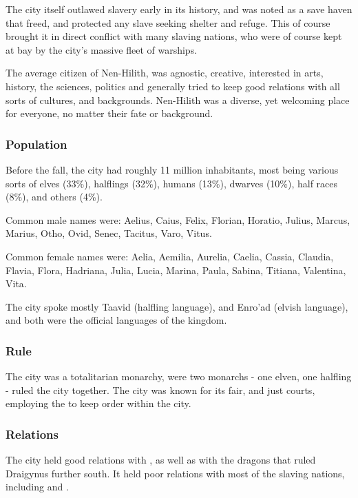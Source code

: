 The city itself outlawed slavery early in its history, and was noted as a save
haven that freed, and protected any slave seeking shelter and refuge. This of
course brought it in direct conflict with many slaving nations, who were of
course kept at bay by the city's massive fleet of warships.

The average citizen of Nen-Hilith, was agnostic, creative, interested in arts,
history, the sciences, politics and generally tried to keep good relations with
all sorts of cultures, and backgrounds. Nen-Hilith was a diverse, yet welcoming
place for everyone, no matter their fate or background.

\subsubsection{Population}

Before the fall, the city had roughly 11 million inhabitants, most being
various sorts of elves (33\%), halflings (32\%), humans (13\%), dwarves
(10\%), half races (8\%), and others (4\%).

Common male names were: Aelius, Caius, Felix, Florian, Horatio, Julius, Marcus,
Marius, Otho, Ovid, Senec, Tacitus, Varo, Vitus.

Common female names were: Aelia, Aemilia, Aurelia, Caelia, Cassia, Claudia,
Flavia, Flora, Hadriana, Julia, Lucia, Marina, Paula, Sabina, Titiana,
Valentina, Vita.

The city spoke mostly Taavid (halfling language), and Enro'ad (elvish language),
and both were the official languages of the kingdom.

\subsubsection{Rule}

The city was a totalitarian monarchy, were two monarchs - one elven, one
halfling - ruled the city together. The city was known for its fair, and just
courts, employing the  to keep order within the
city.

\subsubsection{Relations}

The city held good relations with , as well as with the
dragons that ruled Draigynus further south. It held poor relations with most
of the slaving nations, including  and
.
